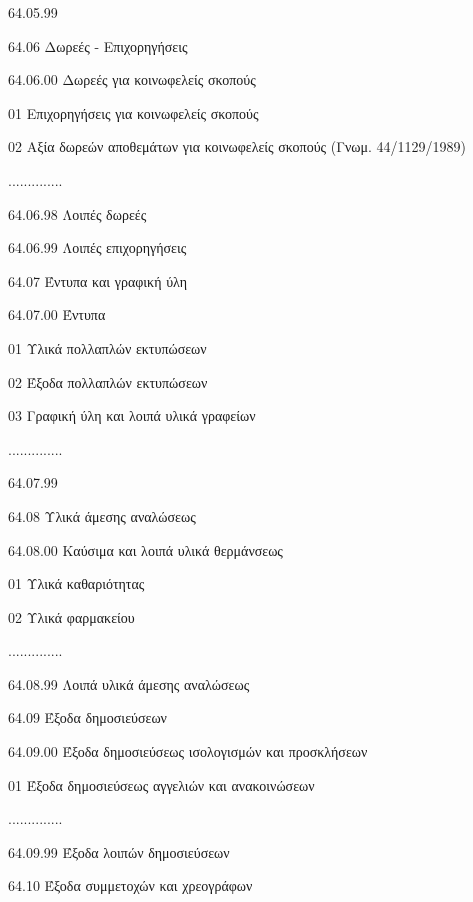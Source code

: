 \documentclass[A4,10pt,greek]{book}
\begin{document}
                       64.05.99

        64.06   Δωρεές - Επιχορηγήσεις

                       64.06.00   Δωρεές για κοινωφελείς σκοπούς

                                 01    Επιχορηγήσεις για κοινωφελείς σκοπούς

                                 02   Αξία δωρεών αποθεμάτων για κοινωφελείς σκοπούς
                                         (Γνωμ. 44/1129/1989)

                       ..............

                       64.06.98   Λοιπές δωρεές

                       64.06.99   Λοιπές επιχορηγήσεις

        64.07   Έντυπα και γραφική ύλη

                       64.07.00   Έντυπα

                                 01   Υλικά πολλαπλών εκτυπώσεων

                                 02   Έξοδα πολλαπλών εκτυπώσεων

                                 03   Γραφική ύλη και λοιπά υλικά γραφείων

                       ..............

                       64.07.99

        64.08   Υλικά άμεσης αναλώσεως

                       64.08.00   Καύσιμα και λοιπά υλικά θερμάνσεως

                                 01   Υλικά καθαριότητας

                                 02   Υλικά φαρμακείου

                       ..............

                       64.08.99   Λοιπά υλικά άμεσης αναλώσεως

        64.09   Έξοδα δημοσιεύσεων

                       64.09.00   Έξοδα δημοσιεύσεως ισολογισμών και προσκλήσεων

                                 01   Έξοδα δημοσιεύσεως αγγελιών και ανακοινώσεων

                       ..............

                       64.09.99   Έξοδα λοιπών δημοσιεύσεων

        64.10   Έξοδα συμμετοχών και χρεογράφων
\end{document}
